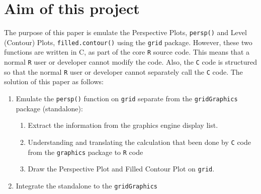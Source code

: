 \documentclass[paper=a4, fontsize=11pt]{report}
\begin{document}
\section{Aim of this project}
The purpose of this paper is emulate the Perspective Plots, \texttt{persp()} and Level (Contour) Plots, \texttt{filled.contour()} using the \texttt{grid} package. However, these two functions are written in C, as part of the core \texttt{R} source code. This means that a normal \texttt{R} user or developer cannot modify the code. Also, the \texttt{C} code is structured so that the normal \texttt{R} user or developer cannot separately call the \texttt{C} code. The solution of this paper as follows: 
\newpage
\begin{enumerate}
	\item Emulate the \texttt{persp()} function on \texttt{grid} separate from the \texttt{gridGraphics} package (standalone):
	\begin{enumerate}
		\item Extract the information from the graphics engine display list.
		\item Understanding and translating the calculation that been done by \texttt{C} code from the \texttt{graphics} package to \texttt{R} code
		\item Draw the Perspective Plot and Filled Contour Plot on \texttt{grid}.
	\end{enumerate}
	\item Integrate the standalone to the \texttt{gridGraphics}
\end{enumerate}



\end{document}
